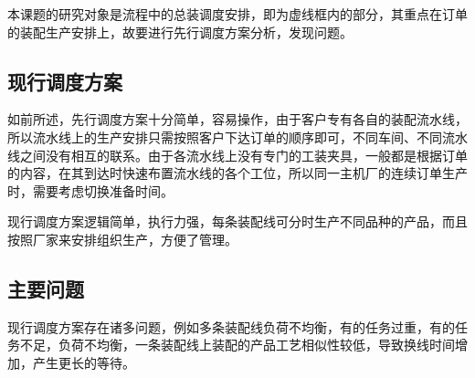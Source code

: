 本课题的研究对象是流程中的总装调度安排，即为虚线框内的部分，其重点在订单的装配生产安排上，故要进行先行调度方案分析，发现问题。
\subsection{现行调度方案}
如前所述，先行调度方案十分简单，容易操作，由于客户专有各自的装配流水线，所以流水线上的生产安排只需按照客户下达订单的顺序即可，不同车间、不同流水线之间没有相互的联系。由于各流水线上没有专门的工装夹具，一般都是根据订单的内容，在其到达时快速布置流水线的各个工位，所以同一主机厂的连续订单生产时，需要考虑切换准备时间。

现行调度方案逻辑简单，执行力强，每条装配线可分时生产不同品种的产品，而且按照厂家来安排组织生产，方便了管理。
\subsection{主要问题}
现行调度方案存在诸多问题，例如多条装配线负荷不均衡，有的任务过重，有的任务不足，负荷不均衡，一条装配线上装配的产品工艺相似性较低，导致换线时间增加，产生更长的等待。

